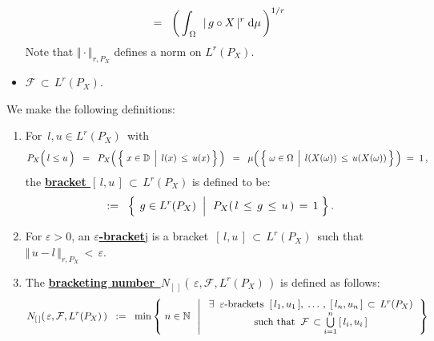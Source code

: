 \begin{definition}
\begin{itemize}
\begin{equation*}
	\; = \;\;
		\left(\,\int_{\,\Omega}\;\, \vert\,g \circ X\,\vert^{r} \;\textnormal{d}\mu\,\right)^{1/r}
	\end{equation*}
	Note that $\Vert\cdot\Vert_{r,P_{X}}$ defines a norm on $L^{r}(P_{X})$. 
\item
	$\mathcal{F} \,\subset\, L^{r}(P_{X})$.
\end{itemize}
We make the following definitions:
\begin{enumerate}
\item
	For \,$l, u \in L^{r}(P_{X})$\, with
	\begin{equation*}
	P_{X}\!\left(\,l \overset{{\color{white}.}}{\leq} u\,\right)
	\;\;=\;\;
		P_{X}\!\left(\,\left\{\,\left. x\overset{{\color{white}.}}{\in}\D \;\,\right\vert\; l(x) \,\leq\, u(x)\,\right\}\,\right)
	\;\;=\;\;
		\mu\!\left(\,\left\{\,
			\left.
			\omega\overset{{\color{white}.}}{\in}\Omega
			\;\,\right\vert\;
			l(X(\omega)) \,\leq\, u(X(\omega))
		\,\right\}\,\right)
	\;=\; 1\,,
	\end{equation*}
	the \underline{\textbf{bracket $[\,l,u\,] \,\subset\,L^{r}(P_{X})$}} is defined to be:
	\begin{equation*}
	[\,l,u\,]
	\;\; := \;\;
		\left\{\;
		\left.
			g \overset{{\color{white}.}}{\in} L^{r}(P_{X})
		\;\;\right\vert\;\,
			P_{X}(\,l \,\overset{{\color{white}.}}{\leq}\, g \,\leq\, u\,) \,=\, 1
		\;\right\}.
	\end{equation*}
\item
	For $\varepsilon > 0$, an \underline{\textbf{$\varepsilon$-bracket}{\color{white}j}}
	is a bracket \,$[\,l,u\,] \,\subset\, L^{r}(P_{X})$\, such that
	\,$\Vert\,u-l\,\Vert_{r,P_{X}} \,<\,\varepsilon$.
\item
	The \underline{\textbf{bracketing number
	\,$N_{[\,]}\!\left(\,\varepsilon,\mathcal{F},L^{r}(P_{X})\,\right)$}}
	is defined as follows:
	\begin{equation*}
	N_{[\,]}\!\left(\,\varepsilon,\mathcal{F},L^{r}(P_{X})\,\right)
	\;\; := \;\;
		\min\left\{\;
			n \overset{{\color{white}.}}{\in} \N
		\;\;\left\vert\;
			\begin{array}{c}
				\exists\;\; \textnormal{$\varepsilon$-brackets}\;\;
				[\,l_{1},u_{1}\,],\; \ldots\,,\; [\,l_{n},u_{n}\,] \,\subset\, L^{r}(P_{X})
			\\
				\overset{{\color{white}1}}{\textnormal{such that}}\;\;
				\mathcal{F} \,\subset \overset{n}{\underset{i=1}{\bigcup}}\,[\,l_{i},u_{i}\,]
			\end{array}
		\right.
		\right\}
	\end{equation*}
\end{enumerate}
\end{definition}

